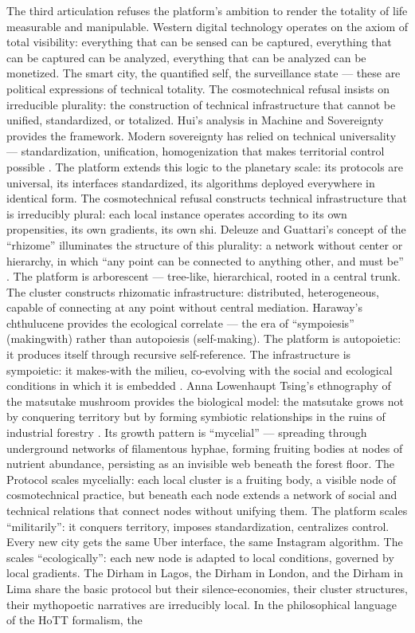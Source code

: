 The third articulation refuses the platform’s ambition to render the totality of life measurable and manipulable. Western digital technology operates on the axiom of total visibility: everything that can be sensed can be captured, everything that can be captured can be analyzed, everything that can be analyzed can be monetized. The smart city, the quantified self, the surveillance state — these are political expressions of technical totality. The cosmotechnical refusal insists on irreducible plurality: the construction of technical infrastructure that cannot be unified, standardized, or totalized. Hui’s analysis in Machine and Sovereignty provides the framework. Modern sovereignty has relied on technical universality — standardization, unification, homogenization that makes territorial control possible \cite{hui_2024}. The platform extends this logic to the planetary scale: its protocols are universal, its interfaces standardized, its algorithms deployed everywhere in identical form. The cosmotechnical refusal constructs technical infrastructure that is irreducibly plural: each local instance operates according to its own propensities, its own gradients, its own shi. Deleuze and Guattari’s concept of the “rhizome” illuminates the structure of this plurality: a network without center or hierarchy, in which “any point can be connected to anything other, and must be” \cite[p.~7]{deleuze_guattari_1987}. The platform is arborescent — tree-like, hierarchical, rooted in a central trunk. The  cluster constructs rhizomatic infrastructure: distributed, heterogeneous, capable of connecting at any point without central mediation. Haraway’s chthulucene provides the ecological correlate — the era of “sympoiesis” (makingwith) rather than autopoiesis (self-making). The platform is autopoietic: it produces itself through recursive self-reference. The  infrastructure is sympoietic: it makes-with the milieu, co-evolving with the social and ecological conditions in which it is embedded \cite{haraway_2016}. Anna Lowenhaupt Tsing’s ethnography of the matsutake mushroom provides the biological model: the matsutake grows not by conquering territory but by forming symbiotic relationships in the ruins of industrial forestry \cite{tsing_2015}. Its growth pattern is “mycelial” — spreading through underground networks of filamentous hyphae, forming fruiting bodies at nodes of nutrient abundance, persisting as an invisible web beneath the forest floor. The  Protocol scales mycelially: each local cluster is a fruiting body, a visible node of cosmotechnical practice, but beneath each node extends a network of social and technical relations that connect nodes without unifying them. The platform scales “militarily”: it conquers territory, imposes standardization, centralizes control. Every new city gets the same Uber interface, the same Instagram algorithm. The  scales “ecologically”: each new node is adapted to local conditions, governed by local gradients. The Dirham in Lagos, the Dirham in London, and the Dirham in Lima share the basic protocol but their silence-economies, their cluster structures, their mythopoetic narratives are irreducibly local. In the philosophical language of the HoTT formalism, the  